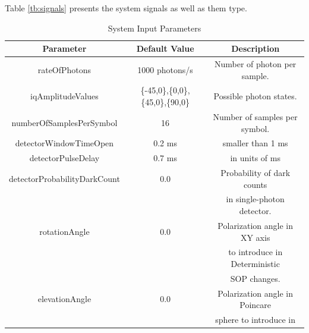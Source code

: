 \begin{refsection}
\begin{table}[H]
\begin{tabular}{|c|c|c|}
\end{tabular}
\end{table}

Table \ref{tb:signals} presents the system signals as well as them type.

\begin{table}[H]
\centering
\caption{System Input Parameters}
\label{tb:inputparameters}
\begin{tabular}{|c|c|c|}
\hline
\textbf{Parameter}                      & \textbf{Default Value}                                & \textbf{Description} \\ \hline
rateOfPhotons                           & 1000 photons/s                                        &  Number of photon per sample.\\ \hline
iqAmplitudeValues                       & \{-45,0\},\{0,0\},\{45,0\},\{90,0\}                   &  Possible photon states. \\ \hline
numberOfSamplesPerSymbol                & 16                                                    &  Number of samples per symbol. \\ \hline
detectorWindowTimeOpen                  & 0.2 ms                                                & smaller than 1 ms \\ \hline
detectorPulseDelay                      & 0.7 ms                                                & in units of ms \\ \hline
detectorProbabilityDarkCount            & 0.0                                                   &  Probability of dark counts  \\
                                        &                                                       &  in single-photon detector.  \\ \hline
rotationAngle                           & 0.0                                                   & Polarization angle in XY axis   \\
                                        &                                                       & to introduce in Deterministic \\
                                        &                                                       & SOP changes.\\ \hline
elevationAngle                          & 0.0                                                   & Polarization angle in Poincare \\
                                        &                                                       &  sphere to introduce in \\

\end{tabular}
\end{table}
\end{refsection}
